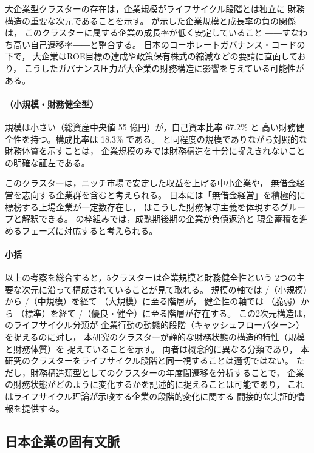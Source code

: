 大企業型クラスターの存在は，企業規模がライフサイクル段階とは独立に
財務構造の重要な次元であることを示す。
 が示した企業規模と成長率の負の関係は，
このクラスターに属する企業の成長率が低く安定していること
――すなわち高い自己遷移率――と整合する。
日本のコーポレートガバナンス・コードの下で，
大企業はROE目標の達成や政策保有株式の縮減などの要請に直面しており，
こうしたガバナンス圧力が大企業の財務構造に影響を与えている可能性がある。

\paragraph{（小規模・財務健全型）}
規模は小さい（総資産中央値 55 億円）が，自己資本比率 67.2\% と
高い財務健全性を持つ。構成比率は 18.3\% である。
 と同程度の規模でありながら対照的な財務体質を示すことは，
企業規模のみでは財務構造を十分に捉えきれないことの明確な証左である。

このクラスターは，ニッチ市場で安定した収益を上げる中小企業や，
無借金経営を志向する企業群を含むと考えられる。
日本には「無借金経営」を積極的に標榜する上場企業が一定数存在し，
 はこうした財務保守主義を体現するグループと解釈できる。
 の枠組みでは，成熟期後期の企業が負債返済と
現金蓄積を進めるフェーズに対応すると考えられる。

\paragraph{小括}
以上の考察を総合すると，5クラスターは企業規模と財務健全性という
2つの主要な次元に沿って構成されていることが見て取れる。
規模の軸では /（小規模）から
/（中規模）を経て （大規模）に至る階層が，
健全性の軸では （脆弱）から （標準）を経て
/（優良・健全）に至る階層が存在する。
この2次元構造は， のライフサイクル分類が
企業行動の動態的段階（キャッシュフローパターン）を捉えるのに対し，
本研究のクラスターが静的な財務状態の構造的特性（規模と財務体質）を
捉えていることを示す。
両者は概念的に異なる分類であり，
本研究のクラスターをライフサイクル段階と同一視することは適切ではない。
ただし，財務構造類型としてのクラスターの年度間遷移を分析することで，
企業の財務状態がどのように変化するかを記述的に捉えることは可能であり，
これはライフサイクル理論が示唆する企業の段階的変化に関する
間接的な実証的情報を提供する。

\subsection{日本企業の固有文脈}

